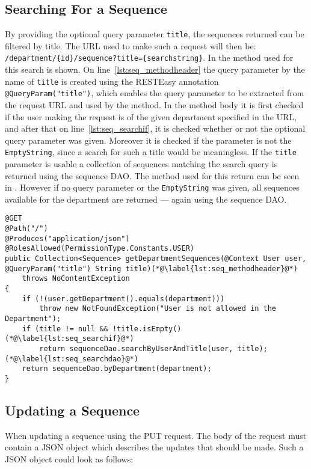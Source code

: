 \subsection{Searching For a Sequence}
By providing the optional query parameter \texttt{title}, the sequences returned can be filtered by title.
The URL used to make such a request will then be: \texttt{/department/\{id\}/sequence?title=\{searchstring\}}.
In  the method used for this search is shown.
On line~\ref{lst:seq_methodheader} the query parameter by the name of \texttt{title} is created using the RESTEasy annotation \texttt{@QueryParam("title")}, which enables the query parameter to be extracted from the request URL and used by the method.
In the method body it is first checked if the user making the request is of the given department specified in the URL, and after that on line~\ref{lst:seq_searchif}, it is checked whether or not the optional query parameter was given.
Moreover it is checked if the parameter is not the \texttt{EmptyString}, since a search for such a title would be meaningless.
If the \texttt{title} parameter is usable a collection of sequences matching the search query is returned using the sequence DAO.
The method used for this return can be seen in .
However if no query parameter or the \texttt{EmptyString} was given, all sequences available for the department are returned --- again using the sequence DAO.

\begin{lstlisting}[float, floatplacement=h, caption={The method which returns a list of sequences; and it can be filtered using a query parameter.}, label={lst:seq_serviceget}]
@GET
@Path("/")
@Produces("application/json")
@RolesAllowed(PermissionType.Constants.USER)
public Collection<Sequence> getDepartmentSequences(@Context User user, @QueryParam("title") String title)(*@\label{lst:seq_methodheader}@*)
    throws NoContentException
{
    if (!(user.getDepartment().equals(department)))
        throw new NotFoundException("User is not allowed in the Department");
    if (title != null && !title.isEmpty()(*@\label{lst:seq_searchif}@*)
        return sequenceDao.searchByUserAndTitle(user, title);(*@\label{lst:seq_searchdao}@*)
    return sequenceDao.byDepartment(department);
}
\end{lstlisting}

\subsection{Updating a Sequence}
When updating a sequence using the PUT request.
The body of the request must contain a JSON object which describes the updates that should be made.
Such a JSON object could look as follows:

